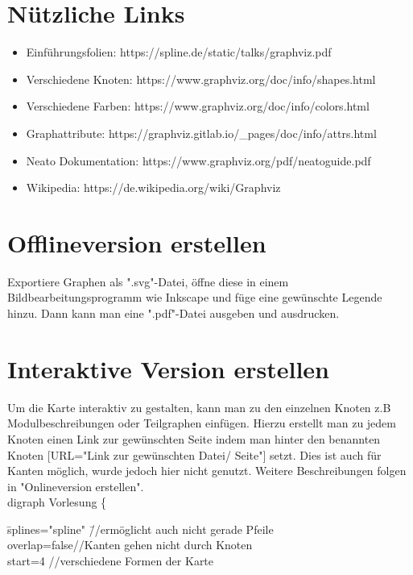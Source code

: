 \documentclass{article}
\begin{document}
\section{Nützliche Links}

\begin{itemize}
\item Einführungsfolien:
https://spline.de/static/talks/graphviz.pdf
\item Verschiedene Knoten: https://www.graphviz.org/doc/info/shapes.html
\item Verschiedene Farben: https://www.graphviz.org/doc/info/colors.html
\item Graphattribute:
https://graphviz.gitlab.io/\_pages/doc/info/attrs.html
\item Neato Dokumentation:
https://www.graphviz.org/pdf/neatoguide.pdf
\item Wikipedia:
https://de.wikipedia.org/wiki/Graphviz
\end{itemize}

\section{Offlineversion erstellen}
    Exportiere Graphen als ".svg"-Datei, öffne diese in einem Bildbearbeitungsprogramm wie Inkscape und füge eine gewünschte Legende hinzu. Dann kann man eine ".pdf"-Datei ausgeben und ausdrucken.

\section{Interaktive Version erstellen}
Um die Karte interaktiv zu gestalten, kann man zu den einzelnen Knoten z.B Modulbeschreibungen oder Teilgraphen einfügen. Hierzu erstellt man zu jedem Knoten einen Link zur gewünschten Seite indem man hinter den benannten Knoten [URL="Link zur gewünschten Datei/ Seite"] setzt. Dies ist auch für Kanten möglich, wurde jedoch hier nicht genutzt. Weitere Beschreibungen folgen in "Onlineversion erstellen".\\

\noindent
digraph Vorlesung \{

\begin{tabbing}
\=splines="spline"\hspace{3cm} \=//ermöglicht auch nicht gerade Pfeile\\
\>overlap=false\>//Kanten gehen nicht durch Knoten\\ 
\>start=4	\>//verschiedene Formen der Karte\\
\>\>\\
\end{tabbing}
\end{document}
